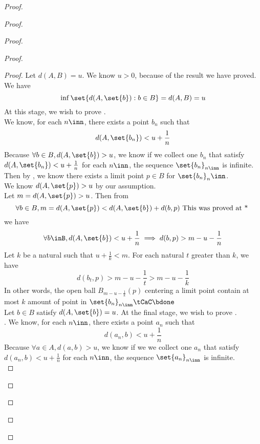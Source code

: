 \documentclass{report}
\begin{document}
\begin{proof}
\begin{proof}
\begin{proof}
\begin{proof}
\begin{proof}
Let $d(A,B)=u$. We know $u>0$, because of the result we have proved.\\

We have 
\begin{equation*}
  \inf \set{d(A,\set{b}):b\in B}=d(A,B)=u
\end{equation*}
At this stage, we wish to prove . \\

We know, for each $n\inn$, there exists a point $b_n$ such that
 \begin{equation*}
d(A,\set{b_n})<u+\frac{1}{n}
\end{equation*}
Because $\forall b\in B, d(A,\set{b})>u$, we know if we collect one $b_n$ that satisfy $d(A,\set{b_n})<u+\frac{1}{n}$ for each $n\inn$, the sequence $\set{b_n}_{n\inn}$ is infinite.\\

Then by , we know there exists a limit point $p\in B$ for $\set{b_n}_n\inn$.\\

We know $d(A,\set{p})>u$ by our assumption.\\

Let $m=d(A,\set{p})>u$. Then from
\begin{equation*}
\forall b\in B,m=d(A,\set{p})<d(A,\set{b})+d(b,p)\text{ This was proved at * }
\end{equation*}
we have
\begin{equation*}
\forall b\inB, d(A,\set{b})<u+\frac{1}{n}\implies d(b,p)>m-u-\frac{1}{n}
\end{equation*}
Let $k$ be a natural such that  $u+\frac{1}{k}<m$. For each natural $t$ greater than  $k$, we have 
\begin{equation*}
d(b_t,p)>m-u-\frac{1}{t}>m-u-\frac{1}{k}
\end{equation*}
In other words, the open ball $B_{m-u-\frac{1}{k}}(p)$ centering a limit point contain at most $k$ amount of point in  $\set{b_n}_{n\inn}\tCaC\bdone$\\

Let $b\in B$ satisfy $d(A,\set{b})=u$. At the final stage, we wish to prove .\\

. We know, for each $n\inn$, there exists a point $a_n$ such that 
\begin{equation*}
d(a_n,b)<u+\frac{1}{n}
\end{equation*}
Because $\forall a\in A, d(a,b)>u$, we know if we we collect one $a_n$ that satisfy  $d(a_n,b)<u+\frac{1}{n}$ for each $n\inn$, the sequence $\set{a_n}_{n\inn}$ is infinite.\\


\end{proof}
\end{proof}
\end{proof}
\end{proof}
\end{proof}
\end{document}
